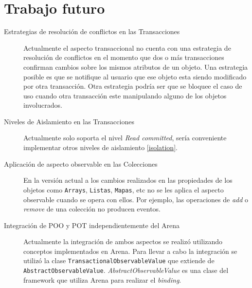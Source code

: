 \section{Trabajo futuro}
\label{Futurework}

\begin{description}

	\item[Estrategias de resolución de conflictos en las Transacciones]
		Actualmente el aspecto transaccional no cuenta con una estrategia de
		resolución de conflictos en	el momento que dos o más transacciones
		confirman cambios sobre los mismos atributos de un objeto.
		Una estrategia posible es que se notifique al usuario que ese
		objeto esta siendo modificado por otra transacción.
		Otra estrategia podría ser que se bloquee el caso de uso cuando otra
		transacción este manipulando alguno de los objetos involucrados.
		
	\item[Niveles de Aislamiento en las Transacciones]
		Actualmente solo soporta el nivel \emph{Read committed}, sería conveniente
		implementar otros niveles de aislamiento \ref{isolation}.
	 
	\item[Aplicación de aspecto observable en las Colecciones]
		En la versión actual a los cambios realizados en las propiedades de los objetos
		como \lstinline|Arrays|, \lstinline|Listas|, \lstinline|Mapas|, etc no se les
		aplica el aspecto observable cuando se opera con ellos. Por ejemplo, las
		operaciones de \emph{add} o \emph{remove} de una colección no producen
		eventos.

	\item[Integración de POO y POT independientemente del Arena]
		Actualmente la integración de ambos aspectos se realizó utilizando conceptos
		implementados en Arena. Para llevar a cabo la integración se utilizó la clase
		\lstinline|TransactionalObservableValue| que extiende de
		\lstinline|AbstractObservableValue|. \emph{AbstractObservableValue} es una
		clase del framework que utiliza Arena para realizar el \emph{binding}.
\end{description}